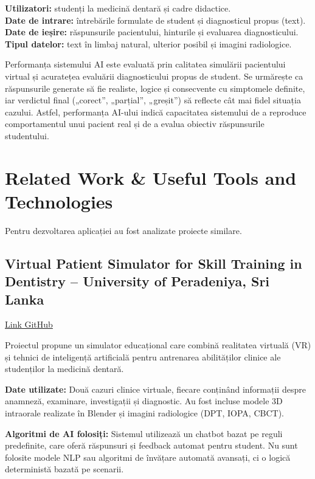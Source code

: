 \documentclass[12pt,a4paper]{article}
\begin{document}
\noindent\textbf{Utilizatori:} studenți la medicină dentară și cadre didactice.\\
\textbf{Date de intrare:} întrebările formulate de student și diagnosticul propus (text).\\
\textbf{Date de ieșire:} răspunsurile pacientului, hinturile și evaluarea diagnosticului.\\
\textbf{Tipul datelor:} text în limbaj natural, ulterior posibil și imagini radiologice.

\medskip
Performanța sistemului AI este evaluată prin calitatea simulării pacientului virtual și acuratețea evaluării diagnosticului propus de student.  
Se urmărește ca răspunsurile generate să fie realiste, logice și consecvente cu simptomele definite, iar verdictul final („corect”, „parțial”, „greșit”) să reflecte cât mai fidel situația cazului.  
Astfel, performanța AI-ului indică capacitatea sistemului de a reproduce comportamentul unui pacient real și de a evalua obiectiv răspunsurile studentului.

\section{Related Work \& Useful Tools and Technologies}

Pentru dezvoltarea aplicației au fost analizate proiecte similare.

\subsection{Virtual Patient Simulator for Skill Training in Dentistry – University of Peradeniya, Sri Lanka}
\href{https://github.com/cepdnaclk/e16-4yp-Virtual-Patient-Simulator-for-Skill-Training-in-Dentistry}{Link GitHub}

Proiectul propune un simulator educațional care combină realitatea virtuală (VR) și tehnici de inteligență artificială pentru antrenarea abilităților clinice ale studenților la medicină dentară.

\textbf{Date utilizate:}
Două cazuri clinice virtuale, fiecare conținând informații despre anamneză, examinare, investigații și diagnostic.  
Au fost incluse modele 3D intraorale realizate în Blender și imagini radiologice (DPT, IOPA, CBCT).

\textbf{Algoritmi de AI folosiți:}
Sistemul utilizează un chatbot bazat pe reguli predefinite, care oferă răspunsuri și feedback automat pentru student.  
Nu sunt folosite modele NLP sau algoritmi de învățare automată avansați, ci o logică deterministă bazată pe scenarii.
\end{document}
